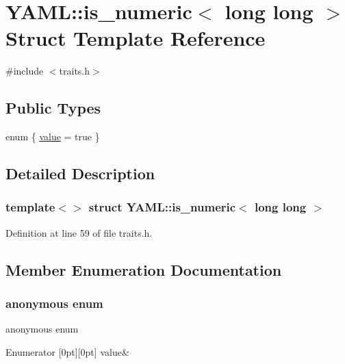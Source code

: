 \hypertarget{struct_y_a_m_l_1_1is__numeric_3_01long_01long_01_4}{}\section{Y\+A\+ML\+::is\+\_\+numeric$<$ long long $>$ Struct Template Reference}
\label{struct_y_a_m_l_1_1is__numeric_3_01long_01long_01_4}


{\ttfamily \#include $<$traits.\+h$>$}

\subsection*{Public Types}
\begin{DoxyCompactItemize}
\item 
enum \{ \mbox{\hyperlink{struct_y_a_m_l_1_1is__numeric_3_01long_01long_01_4_a3815f865a8400c6372a5ec739d556e99a3c1fd49f71b5144936b16c1d67786b7c}{value}} = true
 \}
\end{DoxyCompactItemize}


\subsection{Detailed Description}
\subsubsection*{template$<$$>$\newline
struct Y\+A\+M\+L\+::is\+\_\+numeric$<$ long long $>$}



Definition at line 59 of file traits.\+h.



\subsection{Member Enumeration Documentation}
\mbox{\label{struct_y_a_m_l_1_1is__numeric_3_01long_01long_01_4_a3815f865a8400c6372a5ec739d556e99}} 
\subsubsection{\texorpdfstring{anonymous enum}{anonymous enum}}
{\footnotesize\ttfamily anonymous enum}

\begin{DoxyEnumFields}{Enumerator}
[0pt][0pt]{}\mbox{\label{struct_y_a_m_l_1_1is__numeric_3_01long_01long_01_4_a3815f865a8400c6372a5ec739d556e99a3c1fd49f71b5144936b16c1d67786b7c}} 
value&\\
\hline

\end{DoxyEnumFields}


